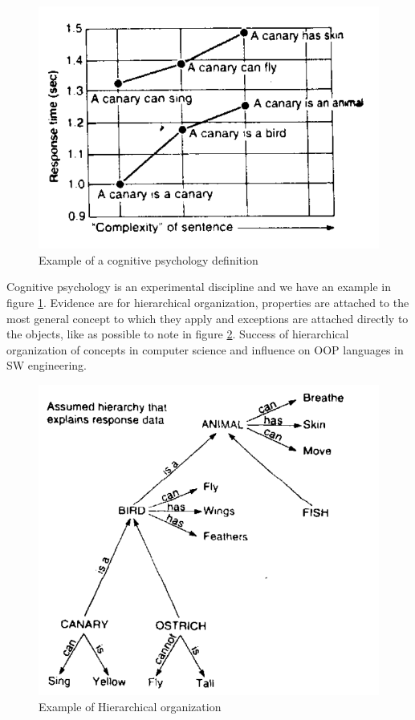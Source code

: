 \begin{figure}
	\includegraphics[width=\textwidth]{Images/cognitive}
	\caption{Example of a cognitive psychology definition}
	\label{img:cognitive}
\end{figure}

Cognitive psychology is an experimental discipline and
we have an example in figure \ref{img:cognitive}.\newline
Evidence are for hierarchical organization, properties are attached to the most general
concept to which they apply and exceptions are attached directly to the objects, like 
as possible to note in figure \ref{img:hierarchical}.\newline
Success of hierarchical organization of concepts in computer science and
influence on OOP languages in SW engineering.

\begin{figure}
	\includegraphics[width=\textwidth]{Images/hierarchical}
	\caption{Example of Hierarchical organization}
	\label{img:hierarchical}
\end{figure}

